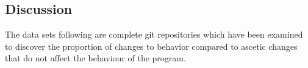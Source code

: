 \subsection{Discussion}

The data sets following are complete git repositories which have been examined to discover the proportion of changes to behavior compared to ascetic changes that do not affect the behaviour of the program. 

% 
% 

% 
% 
% 
% 
 
% 


% 
% 
% 
% 
% 
% 



